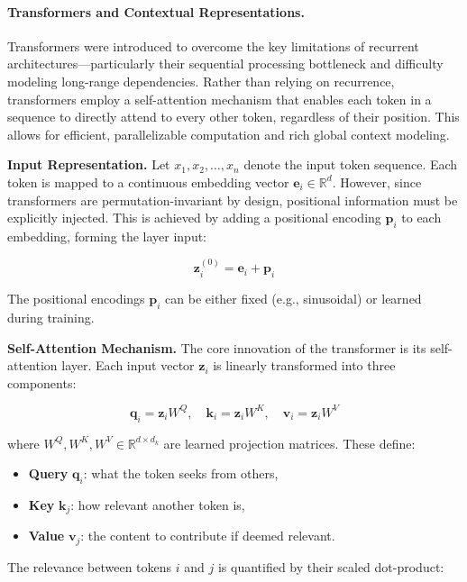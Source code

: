 \documentclass{article}
\begin{document}
\paragraph{Transformers and Contextual Representations.}

Transformers \cite{vaswani2017attention} were introduced to overcome the key limitations of recurrent architectures—particularly their sequential processing bottleneck and difficulty modeling long-range dependencies. Rather than relying on recurrence, transformers employ a self-attention mechanism that enables each token in a sequence to directly attend to every other token, regardless of their position. This allows for efficient, parallelizable computation and rich global context modeling.

\vspace{2mm}
\noindent\textbf{Input Representation.}  
Let $x_1, x_2, \dots, x_n$ denote the input token sequence. Each token is mapped to a continuous embedding vector $\mathbf{e}_i \in \mathbb{R}^d$. However, since transformers are permutation-invariant by design, positional information must be explicitly injected. This is achieved by adding a positional encoding $\mathbf{p}_i$ to each embedding, forming the layer input:

\[
\mathbf{z}_i^{(0)} = \mathbf{e}_i + \mathbf{p}_i
\]

The positional encodings $\mathbf{p}_i$ can be either fixed (e.g., sinusoidal) or learned during training.

\vspace{2mm}
\noindent\textbf{Self-Attention Mechanism.}  
The core innovation of the transformer is its self-attention layer. Each input vector $\mathbf{z}_i$ is linearly transformed into three components:

\[
\mathbf{q}_i = \mathbf{z}_i W^Q, \quad \mathbf{k}_i = \mathbf{z}_i W^K, \quad \mathbf{v}_i = \mathbf{z}_i W^V
\]

where $W^Q, W^K, W^V \in \mathbb{R}^{d \times d_k}$ are learned projection matrices. These define:
\begin{itemize}
    \item \textbf{Query} $\mathbf{q}_i$: what the token seeks from others,
    \item \textbf{Key} $\mathbf{k}_j$: how relevant another token is,
    \item \textbf{Value} $\mathbf{v}_j$: the content to contribute if deemed relevant.
\end{itemize}

The relevance between tokens $i$ and $j$ is quantified by their scaled dot-product:
\end{document}
